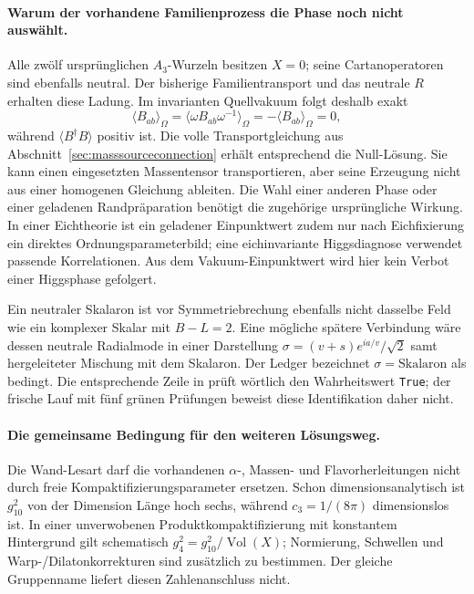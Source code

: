 \paragraph{Warum der vorhandene Familienprozess die Phase noch nicht auswählt.}
Alle zwölf ursprünglichen $A_3$-Wurzeln besitzen $X=0$; seine Cartanoperatoren sind ebenfalls neutral. Der bisherige Familientransport und das neutrale $R$ erhalten diese Ladung. Im invarianten Quellvakuum folgt deshalb exakt
\begin{equation}
\langle B_{ab}\rangle_\Omega
=\langle\omega B_{ab}\omega^{-1}\rangle_\Omega
=-\langle B_{ab}\rangle_\Omega=0,
\end{equation}
während $\langle B^\dagger B\rangle$ positiv ist. Die volle Transportgleichung aus Abschnitt~\ref{sec:masssourceconnection} erhält entsprechend die Null-Lösung. Sie kann einen eingesetzten Massentensor transportieren, aber seine Erzeugung nicht aus einer homogenen Gleichung ableiten. Die Wahl einer anderen Phase oder einer geladenen Randpräparation benötigt die zugehörige ursprüngliche Wirkung. In einer Eichtheorie ist ein geladener Einpunktwert zudem nur nach Eichfixierung ein direktes Ordnungsparameterbild; eine eichinvariante Higgsdiagnose verwendet passende Korrelationen. Aus dem Vakuum-Einpunktwert wird hier kein Verbot einer Higgsphase gefolgert.

Ein neutraler Skalaron ist vor Symmetriebrechung ebenfalls nicht dasselbe Feld wie ein komplexer Skalar mit $B-L=2$. Eine mögliche spätere Verbindung wäre dessen neutrale Radialmode in einer Darstellung $\sigma=(v+s)e^{ia/v}/\sqrt2$ samt hergeleiteter Mischung mit dem Skalaron. Der Ledger bezeichnet $\sigma=\text{Skalaron}$ als bedingt. Die entsprechende Zeile in  prüft wörtlich den Wahrheitswert \texttt{True}; der frische Lauf mit fünf grünen Prüfungen beweist diese Identifikation daher nicht.

\paragraph{Die gemeinsame Bedingung für den weiteren Lösungsweg.}
Die Wand-Lesart darf die vorhandenen $\alpha$-, Massen- und Flavorherleitungen nicht durch freie Kompaktifizierungsparameter ersetzen. Schon dimensionsanalytisch ist $g_{10}^2$ von der Dimension Länge hoch sechs, während $c_3=1/(8\pi)$ dimensionslos ist. In einer unverwobenen Produktkompaktifizierung mit konstantem Hintergrund gilt schematisch $g_4^2=g_{10}^2/\operatorname{Vol}(X)$; Normierung, Schwellen und Warp-/Dilatonkorrekturen sind zusätzlich zu bestimmen. Der gleiche Gruppenname liefert diesen Zahlenanschluss nicht.

